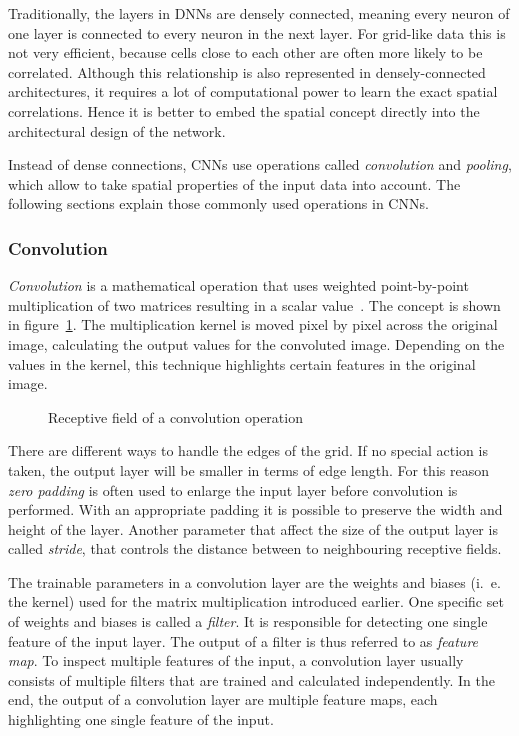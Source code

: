 Traditionally, the layers in DNNs are densely connected, meaning every neuron of one layer is connected to every neuron in the next layer. For grid-like data this is not very efficient, because cells close to each other are often more likely to be correlated. Although this relationship is also represented in densely-connected architectures, it requires a lot of computational power to learn the exact spatial correlations. Hence it is better to embed the spatial concept directly into the architectural design of the network.

Instead of dense connections, CNNs use operations called \emph{convolution} and \emph{pooling}, which allow to take spatial properties of the input data into account. The following sections explain those commonly used operations in CNNs.

\subsubsection{Convolution}
\label{sec:convolution}
\emph{Convolution} is a mathematical operation that uses weighted point-by-point multiplication of two matrices resulting in a scalar value~\cite[p.~361 f]{praxiseinstieg_ml17}. The concept is shown in figure~\ref{fig:convolution}. The multiplication kernel is moved pixel by pixel across the original image, calculating the output values for the convoluted image. Depending on the values in the kernel, this technique highlights certain features in the original image.

\begin{figure}[h]
    \centering
    
    \caption{Receptive field of a convolution operation~\cite[modified]{github-latex20}}
    \label{fig:convolution}
\end{figure}

There are different ways to handle the edges of the grid. If no special action is taken, the output layer will be smaller in terms of edge length. For this reason \emph{zero padding} is often used to enlarge the input layer before convolution is performed. With an appropriate padding it is possible to preserve the width and height of the layer. Another parameter that affect the size of the output layer is called \emph{stride}, that controls the distance between to neighbouring receptive fields.~\cite[p.~361]{praxiseinstieg_ml17}

The trainable parameters in a convolution layer are the weights and biases (i.~e. the kernel) used for the matrix multiplication introduced earlier. One specific set of weights and biases is called a \emph{filter}. It is responsible for detecting one single feature of the input layer. The output of a filter is thus referred to as \emph{feature map}. To inspect multiple features of the input, a convolution layer usually consists of multiple filters that are trained and calculated independently. In the end, the output of a convolution layer are multiple feature maps, each highlighting one single feature of the input.~\cite[p.~363 f]{praxiseinstieg_ml17}

